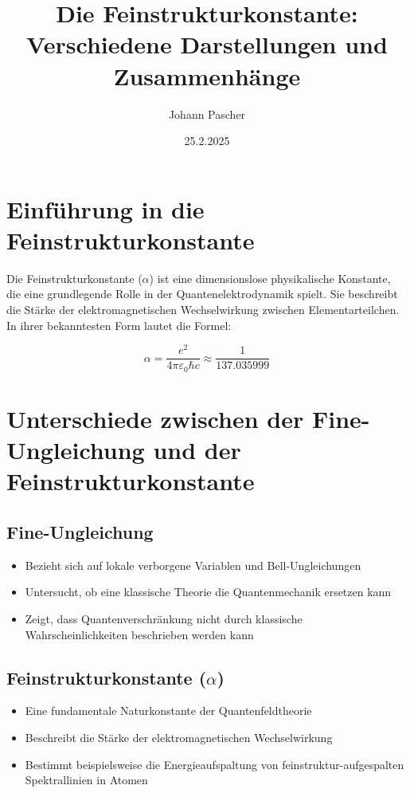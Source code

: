 \documentclass{article}
\title{Die Feinstrukturkonstante: Verschiedene Darstellungen und Zusammenhänge}
\author{Johann Pascher}
\date{25.2.2025}
\begin{document}
	
	\maketitle
	\tableofcontents
	\section{Einführung in die Feinstrukturkonstante}
	
	Die Feinstrukturkonstante ($\alpha$) ist eine dimensionslose physikalische Konstante, die eine grundlegende Rolle in der Quantenelektrodynamik spielt. Sie beschreibt die Stärke der elektromagnetischen Wechselwirkung zwischen Elementarteilchen. In ihrer bekanntesten Form lautet die Formel:
	
	\begin{equation}
		\alpha = \frac{e^2}{4\pi\varepsilon_0\hbar c} \approx \frac{1}{137.035999}
	\end{equation}
	
	\section{Unterschiede zwischen der Fine-Ungleichung und der Feinstrukturkonstante}
	
	\subsection{Fine-Ungleichung}
	\begin{itemize}
		\item Bezieht sich auf lokale verborgene Variablen und Bell-Ungleichungen
		\item Untersucht, ob eine klassische Theorie die Quantenmechanik ersetzen kann
		\item Zeigt, dass Quantenverschränkung nicht durch klassische Wahrscheinlichkeiten beschrieben werden kann
	\end{itemize}
	
	\subsection{Feinstrukturkonstante ($\alpha$)}
	\begin{itemize}
		\item Eine fundamentale Naturkonstante der Quantenfeldtheorie
		\item Beschreibt die Stärke der elektromagnetischen Wechselwirkung
		\item Bestimmt beispielsweise die Energieaufspaltung von feinstruktur-aufgespalten Spektrallinien in Atomen
	\end{itemize}
	
\end{document}
